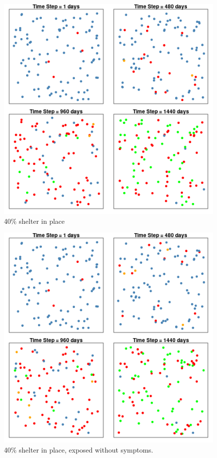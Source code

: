 \documentclass{article}\usepackage[]{graphicx}\usepackage[]{color}
\begin{document}
\begin{figure}
\includegraphics[width=1\textwidth]{SSModel3.png}
\caption{40\% shelter in place}
\end{figure}

\begin{figure}
\includegraphics[width=1\textwidth]{SSModel4.png}
\caption{40\% shelter in place, exposed without symptoms.}
\end{figure}
\end{document}
